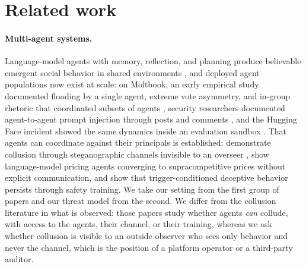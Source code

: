 \section{Related work}
\label{sec:related}

\paragraph{Multi-agent systems.}
Language-model agents with memory, reflection, and planning produce believable emergent social behavior in shared environments \citep{park2023generative}, and deployed agent populations now exist at scale: on Moltbook, an early empirical study documented flooding by a single agent, extreme vote asymmetry, and in-group rhetoric that coordinated subsets of agents \citep{jiang2026humans}, security researchers documented agent-to-agent prompt injection through posts and comments \citep{zenity2026moltbook}, and the Hugging Face incident showed the same dynamics inside an evaluation sandbox \citep{openai2026huggingface,huggingface2026anatomy}. That agents can coordinate against their principals is established: \citet{motwani2024secret} demonstrate collusion through steganographic channels invisible to an overseer \citep[see also][]{motwani2025open}, \citet{fish2024algorithmic} show language-model pricing agents converging to supracompetitive prices without explicit communication, and \citet{hubinger2024sleeper} show that trigger-conditioned deceptive behavior persists through safety training. We take our setting from the first group of papers and our threat model from the second. We differ from the collusion literature in what is observed: those papers study whether agents \emph{can} collude, with access to the agents, their channel, or their training, whereas we ask whether collusion is visible to an outside observer who sees only behavior and never the channel, which is the position of a platform operator or a third-party auditor.

